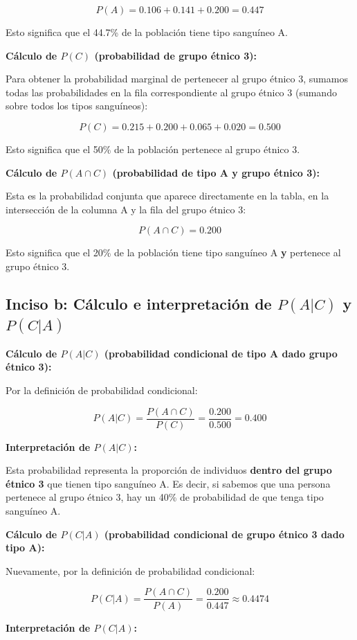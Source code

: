 \documentclass[a4paper]{article}
\begin{document}
$$P(A) = 0.106 + 0.141 + 0.200 = 0.447$$

Esto significa que el 44.7\% de la población tiene tipo sanguíneo A.

\textbf{Cálculo de $P(C)$ (probabilidad de grupo étnico 3):}

Para obtener la probabilidad marginal de pertenecer al grupo étnico 3, sumamos todas las probabilidades en la fila correspondiente al grupo étnico 3 (sumando sobre todos los tipos sanguíneos):

$$P(C) = 0.215 + 0.200 + 0.065 + 0.020 = 0.500$$

Esto significa que el 50\% de la población pertenece al grupo étnico 3.

\textbf{Cálculo de $P(A \cap C)$ (probabilidad de tipo A \textbf{y} grupo étnico 3):}

Esta es la probabilidad conjunta que aparece directamente en la tabla, en la intersección de la columna A y la fila del grupo étnico 3:

$$P(A \cap C) = 0.200$$

Esto significa que el 20\% de la población tiene tipo sanguíneo A \textbf{y} pertenece al grupo étnico 3.

\subsection*{Inciso b: Cálculo e interpretación de $P(A|C)$ y $P(C|A)$}

\textbf{Cálculo de $P(A|C)$ (probabilidad condicional de tipo A dado grupo étnico 3):}

Por la definición de probabilidad condicional:

$$P(A|C) = \frac{P(A \cap C)}{P(C)} = \frac{0.200}{0.500} = 0.400$$

\textbf{Interpretación de $P(A|C)$:}

Esta probabilidad representa la proporción de individuos \textbf{dentro del grupo étnico 3} que tienen tipo sanguíneo A. Es decir, si sabemos que una persona pertenece al grupo étnico 3, hay un 40\% de probabilidad de que tenga tipo sanguíneo A.

\textbf{Cálculo de $P(C|A)$ (probabilidad condicional de grupo étnico 3 dado tipo A):}

Nuevamente, por la definición de probabilidad condicional:

$$P(C|A) = \frac{P(A \cap C)}{P(A)} = \frac{0.200}{0.447} \approx 0.4474$$

\textbf{Interpretación de $P(C|A)$:}
\end{document}
